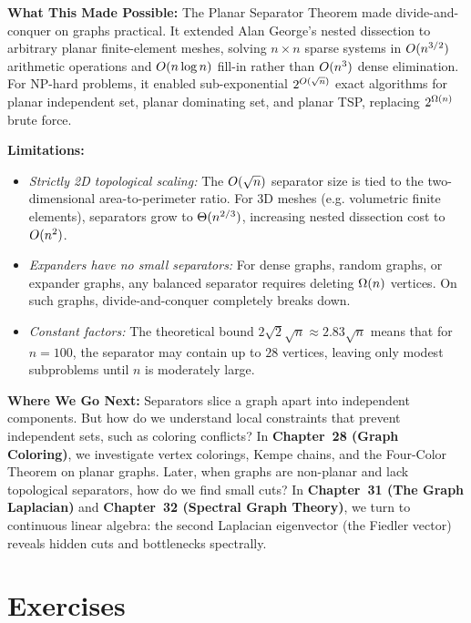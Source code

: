 \begin{connectionbox}
\textbf{What This Made Possible:}
The Planar Separator Theorem made divide-and-conquer on graphs practical. It extended
Alan George's nested dissection to arbitrary planar finite-element meshes, solving
$n\times n$ sparse systems in $O(n^{3/2})$ arithmetic operations and $O(n\log n)$
fill-in rather than $O(n^3)$ dense elimination. For NP-hard problems, it enabled
sub-exponential $2^{O(\sqrt{n})}$ exact algorithms for planar independent set, planar
dominating set, and planar TSP, replacing $2^{\Omega(n)}$ brute force.

\textbf{Limitations:}
\begin{itemize}
  \item \emph{Strictly 2D topological scaling:} The $O(\sqrt{n})$ separator size is
        tied to the two-dimensional area-to-perimeter ratio. For 3D meshes (e.g. volumetric
        finite elements), separators grow to $\Theta(n^{2/3})$, increasing nested dissection
        cost to $O(n^2)$.
  \item \emph{Expanders have no small separators:} For dense graphs, random graphs, or
        expander graphs, any balanced separator requires deleting $\Omega(n)$ vertices.
        On such graphs, divide-and-conquer completely breaks down.
  \item \emph{Constant factors:} The theoretical bound $2\sqrt{2}\sqrt{n} \approx 2.83\sqrt{n}$
        means that for $n = 100$, the separator may contain up to $28$ vertices, leaving
        only modest subproblems until $n$ is moderately large.
\end{itemize}

\textbf{Where We Go Next:}
Separators slice a graph apart into independent components. But how do we understand
local constraints that prevent independent sets, such as coloring conflicts?
In \textbf{Chapter~28 (Graph Coloring)}, we investigate vertex colorings, Kempe chains,
and the Four-Color Theorem on planar graphs.
Later, when graphs are non-planar and lack topological separators, how do we find small
cuts? In \textbf{Chapter~31 (The Graph Laplacian)} and \textbf{Chapter~32 (Spectral
Graph Theory)}, we turn to continuous linear algebra: the second Laplacian eigenvector
(the Fiedler vector) reveals hidden cuts and bottlenecks spectrally.
\end{connectionbox}

\section{Exercises}


